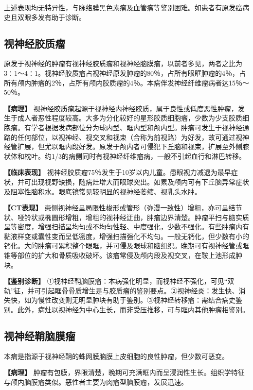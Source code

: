 上述表现均无特异性，与脉络膜黑色素瘤及血管瘤等鉴别困难。如患者有原发癌病史且双眼多发有助于诊断。

\subsection{视神经胶质瘤}

原发于视神经的肿瘤有视神经胶质瘤和视神经脑膜瘤，以前者多见，两者之比为3∶1～4∶1。视神经胶质瘤占视神经原发肿瘤的80％，占所有眼眶肿瘤的4％，占所有颅内肿瘤的2％，占所有颅内胶质瘤的4％。本病伴发神经纤维瘤病者达15％～50％。

\textbf{【病理】}
视神经胶质瘤起源于视神经内神经胶质，属于良性或低度恶性肿瘤，发生于成人者恶性程度较高。大多为分化较好的星形胶质细胞瘤，少数为少支胶质细胞瘤。有学者根据发病部位分为球内型、眶内型和颅内型。肿瘤可发生于视神经通路的任何部位，以视神经、视交叉和视束（合称为前视路）为好发，故可通过视神经管扩展，但尤以眶内段好发。原发于颅内者可侵犯下丘脑和视束，扩展至外侧膝状体和枕叶。约1/3的病侧同时有视神经纤维瘤病，一般不引起血行和淋巴转移。

\textbf{【临床表现】}
视神经胶质瘤75％发生于10岁以内儿童。患眼视力减退为最早症状，并可出现视野缺损，随病灶增大而眼球突出。如累及颅内可有下丘脑异常症状及阻塞性脑积水。眼底镜常见较明显的视神经萎缩、视乳头水肿。

\textbf{【CT表现】}
患侧视神经呈局限性梭形或管形（弥漫一致性）增粗，亦可呈结节状、哑铃状或椭圆形增粗，增粗的视神经迂曲，肿瘤边界清楚。肿瘤平扫与脑实质呈等密度，增强扫描呈均匀或不均匀性轻、中度强化，少数不强化。有些肿瘤内有黏液样变或囊性变而呈低密度，增强扫描强化不均匀。一般无钙化，但少数有小的钙化。大的肿瘤可累积整个眼眶，并可侵及眼球和脑组织。晚期可有视神经管或眶锥等部位的扩大和骨质吸收破坏。该瘤常侵及颅内段及视交叉，在鞍上池形成肿块。

\textbf{【鉴别诊断】}
①视神经鞘脑膜瘤：本病强化明显，而视神经不强化，可见“双轨”征，并可引起眶骨骨质增生是与胶质瘤的鉴别要点。②视神经炎：发生快、消失快，如为慢性改变则无明显肿块有助于鉴别。③视神经转移瘤：需结合病史鉴别。此外，病灶以视神经为中心生长，而非受压推移，可与眶内其他肿瘤相鉴别。

\subsection{视神经鞘脑膜瘤}

本病是指源于视神经鞘的蛛网膜脑膜上皮细胞的良性肿瘤，但少数可恶变。

\textbf{【病理】}
肿瘤有包膜，界限清楚，晚期可充满眶内而呈浸润性生长。组织学特征与颅内脑膜瘤类似。恶性者主要为肉瘤型脑膜瘤，发展迅速。

